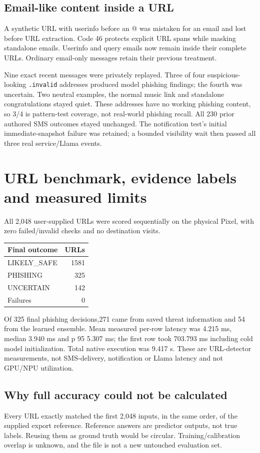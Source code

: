 \documentclass[11pt,a4paper,oneside]{report}
\newcommand{\code}[1]{\nolinkurl{#1}}
\begin{document}
\section{Email-like content inside a URL}
A synthetic URL with userinfo before an @ was mistaken for an email and lost before URL extraction. Code 46 protects explicit URL spans while masking standalone emails. Userinfo and query emails now remain inside their complete URLs. Ordinary email-only messages retain their previous treatment.

Nine exact recent messages were privately replayed. Three of four suspicious-looking \code{.invalid} addresses produced model phishing findings; the fourth was uncertain. Two neutral examples, the normal music link and standalone congratulations stayed quiet. These addresses have no working phishing content, so 3/4 is pattern-test coverage, not real-world phishing recall. All 230 prior authored SMS outcomes stayed unchanged. The notification test's initial immediate-snapshot failure was retained; a bounded visibility wait then passed all three real service/Llama events.

\chapter{URL benchmark, evidence labels and measured limits}
All 2,048 user-supplied URLs were scored sequentially on the physical Pixel, with zero failed/invalid checks and no destination visits.


{\small
\begin{longtable}{@{}lr@{}}
\toprule
Final outcome & URLs\\\midrule\endhead
LIKELY\_SAFE & 1581\\
PHISHING & 325\\
UNCERTAIN & 142\\
Failures & 0\\
\bottomrule\end{longtable}
}


Of 325 final phishing decisions,271 came from saved threat information and 54 from the learned ensemble. Mean measured per-row latency was 4.215 ms, median 3.940 ms and p 95 5.307 ms; the first row took 703.793 ms including cold model initialization. Total native execution was 9.417 s. These are URL-detector measurements, not SMS-delivery, notification or Llama latency and not GPU/NPU utilization.

\section{Why full accuracy could not be calculated}
Every URL exactly matched the first 2,048 inputs, in the same order, of the supplied export reference. Reference answers are predictor outputs, not true labels. Reusing them as ground truth would be circular. Training/calibration overlap is unknown, and the file is not a new untouched evaluation set.
\end{document}
